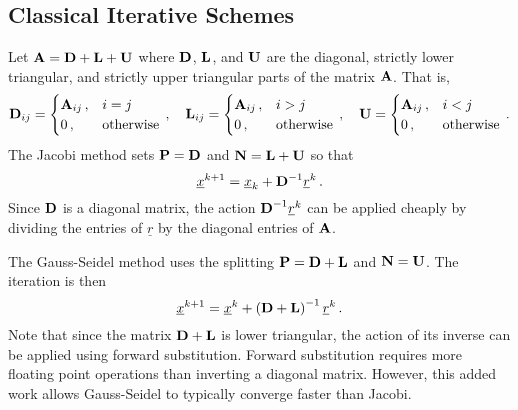\documentclass[../doc.tex]{subfiles}
\begin{document}
\subsection{Classical Iterative Schemes}
Let $\boldsymbol{\mathrm{A}} = \boldsymbol{\mathrm{D}} + \boldsymbol{\mathrm{L}} + \boldsymbol{\mathrm{U}}$ where $\boldsymbol{\mathrm{D}}$, $\boldsymbol{\mathrm{L}}$, and $\boldsymbol{\mathrm{U}}$ are the diagonal, strictly lower triangular, and strictly upper triangular parts of the matrix $\boldsymbol{\mathrm{A}}$. That is, 
	\begin{equation}
		\boldsymbol{\mathrm{D}}_{ij} = \begin{cases}
			\boldsymbol{\mathrm{A}}_{ij} \,, & i=j \\ 
			0 \,, & \text{otherwise}
		\end{cases} \,, \quad 
		\boldsymbol{\mathrm{L}}_{ij} = \begin{cases}
			\boldsymbol{\mathrm{A}}_{ij} \,, & i>j \\ 
			0\,, & \text{otherwise}
		\end{cases} \,, \quad 
		\boldsymbol{\mathrm{U}} = \begin{cases}
			\boldsymbol{\mathrm{A}}_{ij} \,, & i<j\\
			0\,, & \text{otherwise}
		\end{cases} \,. 
	\end{equation}
The Jacobi method sets $\boldsymbol{\mathrm{P}} = \boldsymbol{\mathrm{D}}$ and $\boldsymbol{\mathrm{N}} = \boldsymbol{\mathrm{L}} + \boldsymbol{\mathrm{U}}$ so that 
	\begin{equation}
		\underline{x}^{k+1} = \underline{x}_k + \boldsymbol{\mathrm{D}}^{-1}\underline{r}^k \,. 
	\end{equation}
Since $\boldsymbol{\mathrm{D}}$ is a diagonal matrix, the action $\boldsymbol{\mathrm{D}}^{-1}\underline{r}^k$ can be applied cheaply by dividing the entries of $\underline{r}$ by the diagonal entries of $\boldsymbol{\mathrm{A}}$. 

The Gauss-Seidel method uses the splitting $\boldsymbol{\mathrm{P}} = \boldsymbol{\mathrm{D}} + \boldsymbol{\mathrm{L}}$ and $\boldsymbol{\mathrm{N}} = \boldsymbol{\mathrm{U}}$. The iteration is then 
	\begin{equation}
		\underline{x}^{k+1} = \underline{x}^k + \left( \boldsymbol{\mathrm{D}} + \boldsymbol{\mathrm{L}} \right)^{-1} \underline{r}^k \,. 
	\end{equation}
Note that since the matrix $\boldsymbol{\mathrm{D}} + \boldsymbol{\mathrm{L}}$ is lower triangular, the action of its inverse can be applied using forward substitution. Forward substitution requires more floating point operations than inverting a diagonal matrix. However, this added work allows Gauss-Seidel to typically converge faster than Jacobi. 

\subsection{}
\end{document}

